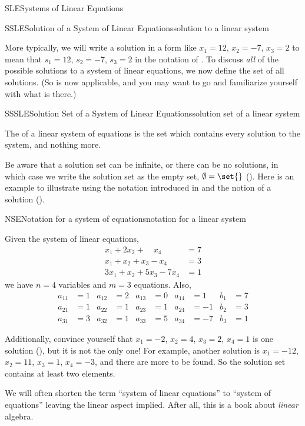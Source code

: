 \begin{subsect}{SLE}{Systems of Linear Equations}
\begin{definition}{SSLE}{Solution of a System of Linear Equations}{solution to a linear system}
\end{definition}
%
\begin{para}More typically, we will write a solution in a form like $x_1=12$, $x_2=-7$, $x_3=2$ to mean that $s_1=12$, $s_2=-7$, $s_3=2$ in the notation of .  To discuss {\em all} of the possible solutions to a system of linear equations, we now define the set of all solutions.  (So  is now applicable, and you may want to go and familiarize yourself with what is there.)\end{para}
%
\begin{definition}{SSSLE}{Solution Set of a System of Linear Equations}{solution set of a linear system}
\begin{para}The  of a linear system of equations is the set which contains every solution to the system, and nothing more.\end{para}
\end{definition}
%
\begin{para}Be aware that a solution set can be infinite, or there can be no solutions, in which case we write the solution set as the empty set, $\emptyset=\set{}$ ().  Here is an example to illustrate using the notation introduced in  and the notion of a solution ().\end{para}
%
\begin{example}{NSE}{Notation for a system of equations}{notation for a linear system}
\begin{para}Given the system of linear equations,
%
\begin{align*}
x_1+2x_2 +\quad x_4&= 7\\
x_1+x_2+x_3-x_4&=3\\
3x_1+x_2+5x_3-7x_4&=1
\end{align*}
%
we have $n=4$ variables and $m=3$ equations.  Also,
%
\begin{align*}
a_{11}&=1 & a_{12}&=2 & a_{13}&=0 & a_{14}&=1 & b_{1}&=7\\
a_{21}&=1 & a_{22}&=1 & a_{23}&=1 & a_{24}&=-1 & b_{2}&=3\\
a_{31}&=3 & a_{32}&=1 & a_{33}&=5 & a_{34}&=-7 & b_{3}&=1
\end{align*}\end{para}
%
\begin{para}Additionally, convince yourself that $x_{1}=-2$, $x_{2}=4$, $x_{3}=2$, $x_{4}=1$ is one solution (), but it is not the only one!  For example, another solution is $x_{1}=-12$, $x_{2}=11$, $x_{3}=1$, $x_{4}=-3$, and there are more to be found.  So the solution set contains at least two elements.\end{para}
\end{example}
%
\begin{para}We will often shorten the term  ``system of linear equations'' to ``system of equations'' leaving the linear aspect implied.  After all, this is a book about {\em linear} algebra.\end{para}
%
\end{subsect}
